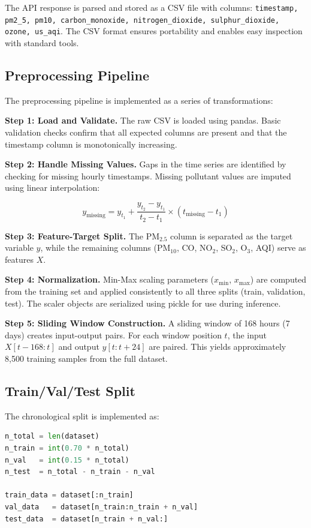 The API response is parsed and stored as a CSV file with columns: \texttt{timestamp, pm2\_5, pm10, carbon\_monoxide, nitrogen\_dioxide, sulphur\_dioxide, ozone, us\_aqi}. The CSV format ensures portability and enables easy inspection with standard tools.

\subsection{Preprocessing Pipeline}

The preprocessing pipeline is implemented as a series of transformations:

\textbf{Step 1: Load and Validate.} The raw CSV is loaded using pandas. Basic validation checks confirm that all expected columns are present and that the timestamp column is monotonically increasing.

\textbf{Step 2: Handle Missing Values.} Gaps in the time series are identified by checking for missing hourly timestamps. Missing pollutant values are imputed using linear interpolation:

\begin{equation}
    y_{\text{missing}} = y_{t_1} + \frac{y_{t_2} - y_{t_1}}{t_2 - t_1} \times (t_{\text{missing}} - t_1)
\end{equation}

\textbf{Step 3: Feature-Target Split.} The PM$_{2.5}$ column is separated as the target variable $y$, while the remaining columns (PM$_{10}$, CO, NO$_2$, SO$_2$, O$_3$, AQI) serve as features $X$.

\textbf{Step 4: Normalization.} Min-Max scaling parameters ($x_{\min}$, $x_{\max}$) are computed from the training set and applied consistently to all three splits (train, validation, test). The scaler objects are serialized using pickle for use during inference.

\textbf{Step 5: Sliding Window Construction.} A sliding window of 168 hours (7 days) creates input-output pairs. For each window position $t$, the input $X[t-168:t]$ and output $y[t:t+24]$ are paired. This yields approximately 8,500 training samples from the full dataset.

\subsection{Train/Val/Test Split}

The chronological split is implemented as:

\begin{lstlisting}[language=Python]
n_total = len(dataset)
n_train = int(0.70 * n_total)
n_val   = int(0.15 * n_total)
n_test  = n_total - n_train - n_val

train_data = dataset[:n_train]
val_data   = dataset[n_train:n_train + n_val]
test_data  = dataset[n_train + n_val:]
\end{lstlisting}

